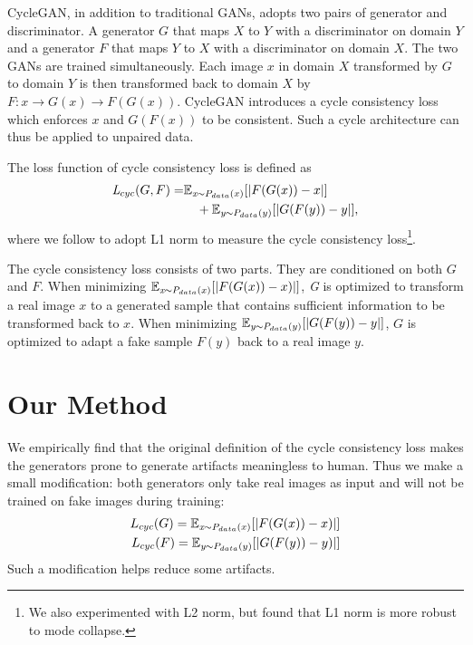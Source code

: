 \documentclass[letterpaper]{article} %
\begin{document}
	CycleGAN, in addition to traditional GANs, adopts two pairs of generator and discriminator. A generator $G$ that maps $X$ to $Y$ with a discriminator on domain $Y$ and a generator $F$ that maps $Y$ to $X$ with a discriminator on domain $X$. The two GANs are trained simultaneously. Each image $x$ in domain $X$ transformed by $G$ to domain $Y$ is then transformed back to domain $X$ by $F: x \rightarrow G(x) \rightarrow F(G(x))$. CycleGAN introduces a cycle consistency loss which enforces $x$ and $G(F(x))$ to be consistent. Such a cycle architecture can thus be applied to unpaired data.
	
	The loss function of cycle consistency loss is defined as
	\begin{align} \label{org_cycle_loss}
	\emph{L}_{cyc}(G,F)=&\mathbb{E}_{\emph{x} \sim P_{data}(x)}[\lvert F(G(x))-x\rvert] \nonumber\\ 
	&~~~ +\mathbb{E}_{\emph{y} \sim P_{data}(y)}[\lvert G(F(y))-y \rvert],
	\end{align} 
	where we follow \cite{zhu2017unpaired,yi2017dualgan} to adopt L1 norm to measure the cycle consistency loss\footnote{We also experimented with L2 norm, but found that L1 norm is more robust to mode collapse.}. 
	
	The cycle consistency loss consists of two parts. They are conditioned on both $G$ and $F$. When minimizing $\mathbb{E}_{\emph{x} \sim P_{data}(x)}[\lvert F(G(x))-x)\rvert]$, \emph{G} is optimized to transform a real image $x$ to a generated sample that contains sufficient information to be transformed back to $x$. When minimizing $\mathbb{E}_{\emph{y} \sim P_{data}(y)}[\lvert G(F(y))-y \rvert]$, $G$ is optimized to adapt a fake sample $F(y)$ back to a real image $y$. 
	
	\section{Our Method}
	
	We empirically find that the original definition of the cycle consistency loss  makes the generators prone to generate artifacts meaningless to human. Thus we make a small modification: both generators only take real images as input and will not be trained on fake images during training:
	\begin{align}
	L_{cyc}(G) = \mathbb{E}_{\emph{x} \sim P_{data}(x)}[\lvert F(G(x))-x)\rvert] \nonumber\\
	L_{cyc}(F) = \mathbb{E}_{\emph{y} \sim P_{data}(y)}[\lvert G(F(y))-y)\rvert]
	\end{align}
	Such a modification helps reduce some artifacts.
	
\end{document}
